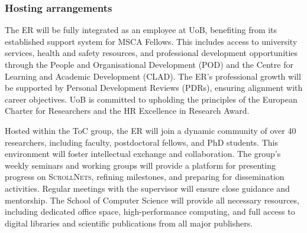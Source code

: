 \documentclass[11pt]{msca-pf}
\newcommand{\proj}{\small\textsc{ScrollNets}}
\begin{document}
\subsubsection{Hosting arrangements}

The ER will be fully integrated as an employee at UoB, benefiting from its established support
system for MSCA Fellows. This includes access to university services, health and safety resources,
and professional development opportunities through the People and Organisational Development (POD)
and the Centre for Learning and Academic Development (CLAD). The ER's professional growth will be
supported by Personal Development Reviews (PDRs), ensuring alignment with career objectives. UoB is
committed to upholding the principles of the European Charter for Researchers and the HR Excellence
in Research Award.

Hosted within the ToC group, the ER will join a dynamic community of over 40 researchers, including
faculty, postdoctoral fellows, and PhD students. This environment will foster intellectual exchange
and collaboration. The group's weekly seminars and working groups will provide a platform for
presenting progress on {\proj}, refining milestones, and preparing for dissemination activities.
Regular meetings with the supervisor will ensure close guidance and mentorship. The School of
Computer Science will provide all necessary resources, including dedicated office space,
high-performance computing, and full access to digital libraries and scientific publications from
all major publishers.








   
\end{document}
